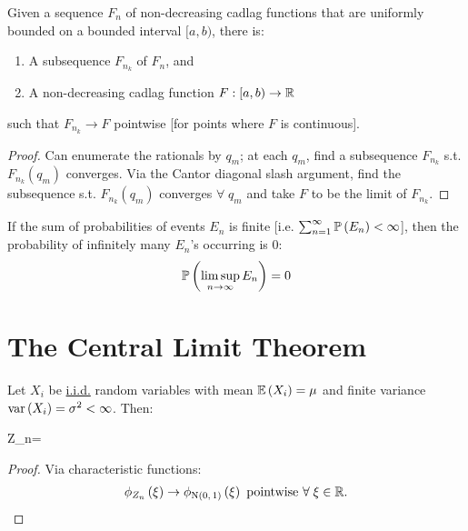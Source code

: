 \documentclass[12pt]{extarticle}
\begin{document}
\begin{theorem}
    Given a sequence $F_n$ of non-decreasing cadlag functions that are uniformly bounded on a bounded interval $[a,b)$, there is: \begin{enumerate}
        \item A subsequence $F_{n_k}$ of $F_n$, and 
        \item A non-decreasing cadlag function $F:[a,b)\to\mathbb{R}$
    \end{enumerate} such that $F_{n_k}\to F$ pointwise [for points where $F$ is continuous].
\end{theorem}

\newp
\begin{proof}
    Can enumerate the rationals by $q_m$; at each $q_m$, find a subsequence $F_{n_k}$ s.t. $F_{n_k}(q_m)$ converges. Via the Cantor diagonal slash argument, find the subsequence s.t. $F_{n_k}(q_m)$ converges $\forall\;q_m$ and take $F$ to be the limit of $F_{n_k}$.
\end{proof}

\newp
\begin{lemma}
    If the sum of probabilities of events $E_n$ is finite [i.e. $\sum_{n=1}^\infty\mathbb{P}\left(E_n\right)<\infty$], then the probability of infinitely many $E_n$'s occurring is 0: \begin{align*}
        \mathbb{P}\left(\limsup_{n\to\infty}E_n\right)=0
    \end{align*}
\end{lemma}

\pagebreak
\section{The Central Limit Theorem}
\begin{tcolorbox}[colback=white]
    \begin{theorem}
        Let $X_i$ be \ul{i.i.d.} random variables with mean $\mathbb{E}\left(X_i\right)=\mu$ and finite variance $\text{var}\left(X_i\right)=\sigma^2<\infty$. Then: \begin{eqnbox}
            Z_n=
        \end{eqnbox}
    \end{theorem}
\end{tcolorbox}

\begin{proof}
    Via characteristic functions: \begin{align*}
        \phi_{Z_n}\left(\xi\right)\to\phi_{\text{N}\left(0,\,1\right)}\left(\xi\right)\text{ pointwise $\forall\;\xi\in\mathbb{R}$.}
    \end{align*}
\end{proof}
\end{document}
